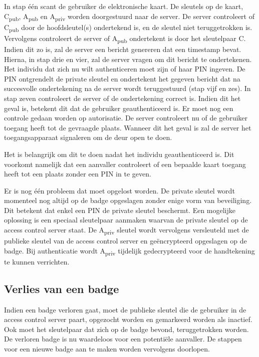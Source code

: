 In stap één scant de gebruiker de elektronische kaart. De sleutels op de kaart,
C\textsubscript{pub}, A\textsubscript{pub} en A\textsubscript{priv} worden
doorgestuurd naar de server. De server controleert of C\textsubscript{pub} door
de hoofdsleutel(s) ondertekend is, en de sleutel niet teruggetrokken is.
Vervolgens controleert de server of A\textsubscript{pub} ondertekent is door het
sleutelpaar C.
Indien dit zo is, zal de server een bericht genereren dat een timestamp bevat.
Hierna, in stap drie en vier, zal de server vragen om dit bericht te
ondertekenen. Het individu dat zich nu wilt authenticeren moet zijn of haar PIN
ingeven. De PIN ontgrendelt de private sleutel en ondertekent het gegeven
bericht dat na succesvolle ondertekening na de server wordt teruggestuurd (stap
vijf en zes). In stap zeven controleert de server of de ondertekening correct
is. Indien dit het geval is, betekent dit dat de gebruiker geauthenticeerd is.
Er moet nog een controle gedaan worden op autorisatie. De server controleert nu
of de gebruiker toegang heeft tot de gevraagde plaats. Wanneer dit het geval is
zal de server het toegangsapparaat signaleren om de deur open te doen.

Het is belangrijk om dit te doen nadat het individu geauthenticeerd is. Dit
voorkomt namelijk dat een aanvaller controleert of een bepaalde kaart toegang
heeft tot een plaats zonder een PIN in te geven.

Er is nog één probleem dat moet opgelost worden. De private sleutel wordt
momenteel nog altijd op de badge opgeslagen zonder enige vorm van beveiliging.
Dit betekent dat enkel een PIN de private sleutel beschermt. Een mogelijke
oplossing is een speciaal sleutelpaar aanmaken waarvan de private sleutel op de
access control server staat. De A\textsubscript{priv} sleutel wordt vervolgens
versleuteld met de publieke sleutel van de access control server en
geëncrypteerd opgeslagen op de badge. Bij authenticatie wordt
A\textsubscript{priv} tijdelijk gedecrypteerd voor de handtekening te kunnen
verrichten.

\subsection{Verlies van een badge}

Indien een badge verloren gaat, moet de publieke sleutel die de gebruiker in de
access control server paart, opgezocht worden en gemarkeerd worden als inactief.
Ook moet het sleutelpaar dat zich op de badge bevond, teruggetrokken worden. De
verloren badge is nu waardeloos voor een potentiële aanvaller. De stappen voor
een nieuwe badge aan te maken worden vervolgens doorlopen.

